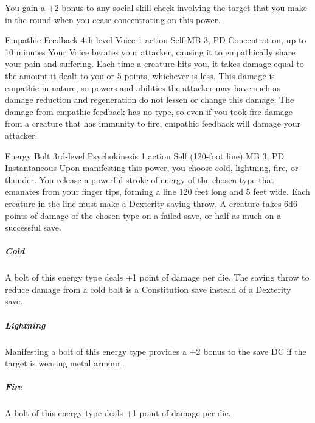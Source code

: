 You gain a +2 bonus to any social skill check involving the target
that you make in the round when you cease concentrating on this power.

\DndPowerHeader%
  {Empathic Feedback}
  {4th-level Voice}
  {1 action}
  {Self}
  {MB 3, PD \lvlfour}
  {Concentration, up to 10 minutes}
Your Voice berates your attacker,
causing it to empathically share your pain and suffering.
Each time a creature hits you,
it takes damage equal to the amount it dealt to you or 5 points,
whichever is less.
This damage is empathic in nature,
so powers and abilities the attacker may have such as damage reduction
and regeneration do not lessen or change this damage.
The damage from empathic feedback has no type,
so even if you took fire damage from a creature
that has immunity to fire,
empathic feedback will damage your attacker.

\DndPowerHeader%
  {Energy Bolt}
  {3rd-level Psychokinesis}
  {1 action}
  {Self (120-foot line)}
  {MB 3, PD \lvlthree}
  {Instantaneous}
Upon manifesting this power, you choose cold, lightning,
fire, or thunder.
You release a powerful stroke of energy of the chosen type
that emanates from your finger tips,
forming a line 120 feet long and 5 feet wide.
Each creature in the line must make a Dexterity saving throw.
A creature takes 6d6 points of damage of the chosen type
on a failed save,
or half as much on a successful save.

\subparagraph{Cold}
A bolt of this energy type deals +1 point of damage per die.
The saving throw to reduce damage from a cold bolt
is a Constitution save instead of a Dexterity save.

\subparagraph{Lightning}
Manifesting a bolt of this energy type provides
a +2 bonus to the save DC if the target is wearing metal armour.

\subparagraph{Fire}
A bolt of this energy type deals +1 point of damage per die.

